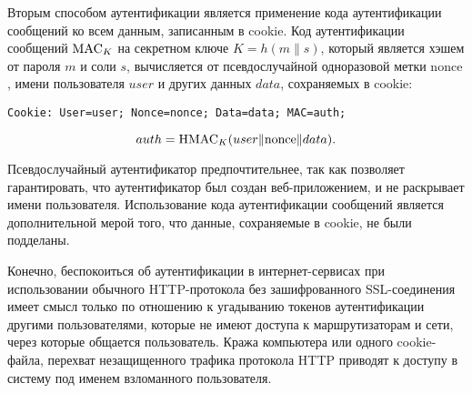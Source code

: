 Вторым способом аутентификации является применение кода аутентификации сообщений ко всем данным, записанным в cookie. Код аутентификации сообщений $\textrm{MAC}_K$ на секретном ключе $K = h(m \| s)$, который является хэшем от пароля $m$ и соли $s$, вычисляется от псевдослучайной одноразовой метки $\textrm{nonce}$, имени пользователя $user$ и других данных $data$, сохраняемых в cookie:
\begin{center} \begin{verbatim}
Cookie: User=user; Nonce=nonce; Data=data; MAC=auth;
\end{verbatim} \end{center}
    \[ auth = \textrm{HMAC}_K(user \| \textrm{nonce} \| data). \]

Псевдослучайный аутентификатор предпочтительнее, так как позволяет гарантировать, что аутентификатор был создан веб-приложением, и не раскрывает имени пользователя. Использование кода аутентификации сообщений является дополнительной мерой того, что данные, сохраняемые в cookie, не были подделаны.

Конечно, беспокоиться об аутентификации в интернет-сервисах при использовании обычного HTTP-протокола без зашифрованного SSL-соединения имеет смысл только по отношению к угадыванию токенов аутентификации другими пользователями, которые не имеют доступа к маршрутизаторам и сети, через которые общается пользователь. Кража компьютера или одного cookie-файла, перехват незащищенного трафика протокола HTTP приводят к доступу в систему под именем взломанного пользователя.
